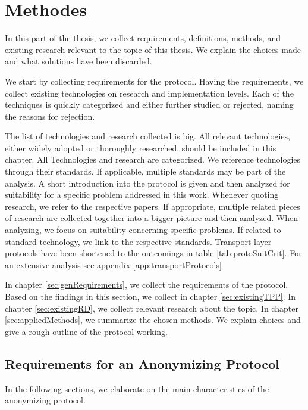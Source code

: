 

\part{Methodes\label{sec:methodes}}
In this part of the thesis, we collect requirements, definitions, methods, and existing research relevant to the topic of this thesis. We explain the choices made and what solutions have been discarded.

We start by collecting requirements for the protocol. Having the requirements, we collect existing technologies on research and implementation levels. Each of the techniques is quickly categorized and either further studied or rejected, naming the reasons for rejection.

The list of technologies and research collected is big. All relevant technologies, either widely adopted or thoroughly researched, should be included in this chapter. All Technologies and research are categorized. We reference technologies through their standards. If applicable, multiple standards may be part of the analysis. A short introduction into the protocol is given and then analyzed for suitability for a specific problem addressed in this work. Whenever quoting research, we refer to the respective papers. If appropriate, multiple related pieces of research are collected together into a bigger picture and then analyzed. When analyzing, we focus on suitability concerning specific problems. If related to standard technology, we link to the respective standards. Transport layer protocols have been shortened to the outcomings in table \ref{tab:protoSuitCrit}. For an extensive analysis see appendix \ref{app:transportProtocols}

In chapter \ref{sec:genRequirements}, we collect the requirements of the protocol. Based on the findings in this section, we collect in chapter \ref{sec:existingTPP}. In chapter \ref{sec:existingRD}, we collect relevant research about the topic. In chapter \ref{sec:appliedMethods}, we summarize the chosen methods. We explain choices and give a rough outline of the protocol working.

\chapter{Requirements for an Anonymizing Protocol\label{sec:genRequirements}}
In the following sections, we elaborate on the main characteristics of the anonymizing protocol. 

